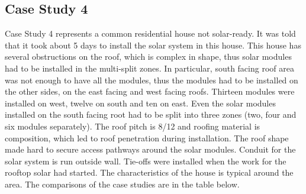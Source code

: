 \documentclass[]{article}
\begin{document}
\hypertarget{case-study-4}{%
\subsection{Case Study 4}\label{case-study-4}}

Case Study 4 represents a common residential house not solar-ready. It
was told that it took about 5 days to install the solar system in this
house. This house has several obstructions on the roof, which is complex
in shape, thus solar modules had to be installed in the multi-split
zones. In particular, south facing roof area was not enough to have all
the modules, thus the modules had to be installed on the other sides, on
the east facing and west facing roofs. Thirteen modules were installed
on west, twelve on south and ten on east. Even the solar modules
installed on the south facing root had to be split into three zones
(two, four and six modules separately). The roof pitch is 8/12 and
roofing material is composition, which led to roof penetration during
installation. The roof shape made hard to secure access pathways around
the solar modules. Conduit for the solar system is run outside wall.
Tie-offs were installed when the work for the rooftop solar had started.
The characteristics of the house is typical around the area. The
comparisons of the case studies are in the table below.
\end{document}
